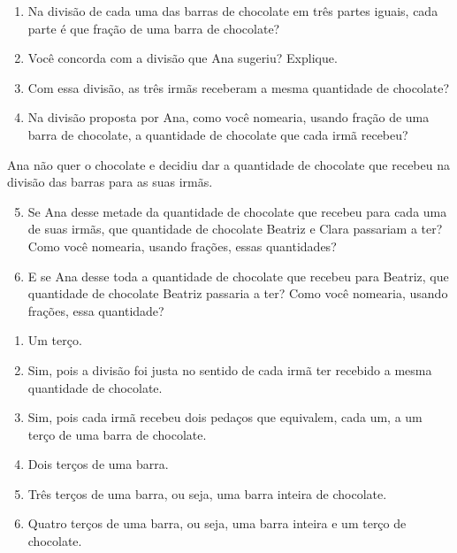 \documentclass[10 pt,usenames,dvipsnames, oneside]{article}
\begin{document}
\begin{enumerate}[label=\alph*)] %
  \item Na divisão de cada uma das barras de chocolate em três partes iguais, cada parte é que fração de uma barra de chocolate?
  \item Você concorda com a divisão que Ana sugeriu? Explique.
  \item Com essa divisão, as três irmãs receberam a mesma quantidade de chocolate?
  \item Na divisão proposta por Ana, como você nomearia, usando fração de uma barra de chocolate, a quantidade de chocolate que cada irmã recebeu?
\end{enumerate}

Ana não quer o chocolate e decidiu dar a quantidade de chocolate que recebeu na divisão das barras para as suas irmãs.

\begin{enumerate}[label=\alph*)]
\setcounter{enumi}{4}
\item Se Ana desse metade da quantidade de chocolate que recebeu para cada uma de suas irmãs, que quantidade de chocolate Beatriz e Clara passariam a ter? Como você nomearia, usando frações, essas quantidades?
\item E se Ana desse toda a quantidade de chocolate que recebeu para Beatriz, que quantidade de chocolate  Beatriz passaria a ter? Como você nomearia, usando frações, essa quantidade?
\end{enumerate} %

\ifdefined\prof
\clearpage
\begin{solucao}

\begin{enumerate} [label=\alph*)] %
    \item  Um terço.
    \item  Sim, pois a divisão foi justa no sentido de cada irmã ter recebido a mesma quantidade de chocolate.
    \item  Sim, pois cada irmã recebeu dois pedaços que equivalem, cada um, a um terço de uma barra de chocolate.
    \item  Dois terços de uma barra.
    \item  Três terços de uma barra, ou seja, uma barra inteira de chocolate.
    \item  Quatro terços de uma barra, ou seja, uma barra inteira e um terço de chocolate.
\end{enumerate} %

\end{solucao}
\fi
\end{document}
